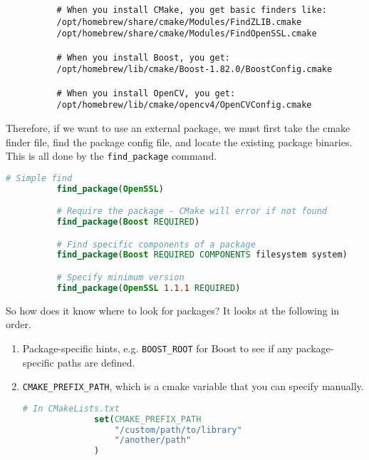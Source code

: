 \documentclass{article}
\begin{document}
      \begin{example}
        \begin{lstlisting}
          # When you install CMake, you get basic finders like:
          /opt/homebrew/share/cmake/Modules/FindZLIB.cmake
          /opt/homebrew/share/cmake/Modules/FindOpenSSL.cmake

          # When you install Boost, you get:
          /opt/homebrew/lib/cmake/Boost-1.82.0/BoostConfig.cmake

          # When you install OpenCV, you get:
          /opt/homebrew/lib/cmake/opencv4/OpenCVConfig.cmake 
        \end{lstlisting}
      \end{example} 

      \begin{definition}
        Therefore, if we want to use an external package, we must first take the cmake finder file, find the package config file, and locate the existing package binaries. This is all done by the \texttt{find\_package} command. 

        \begin{lstlisting}[language=CMake]
          # Simple find
          find_package(OpenSSL)

          # Require the package - CMake will error if not found
          find_package(Boost REQUIRED)

          # Find specific components of a package
          find_package(Boost REQUIRED COMPONENTS filesystem system)

          # Specify minimum version
          find_package(OpenSSL 1.1.1 REQUIRED) 
        \end{lstlisting}

        So how does it know where to look for packages? It looks at the following in order. 
        \begin{enumerate}
          \item Package-specific hints, e.g. \texttt{BOOST\_ROOT} for Boost to see if any package-specific paths are defined. 

          \item \texttt{CMAKE\_PREFIX\_PATH}, which is a cmake variable that you can specify manually. 
            \begin{lstlisting}[language=CMake]
              # In CMakeLists.txt
              set(CMAKE_PREFIX_PATH 
                  "/custom/path/to/library"
                  "/another/path"
              ) 
            \end{lstlisting}


\end{enumerate}
\end{definition}
\end{document}
